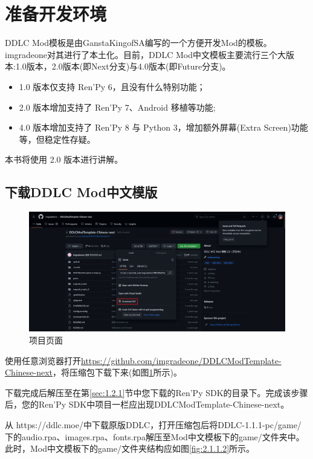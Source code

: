\documentclass[../../Main.tex]{subfiles}
\begin{document}
\section{准备开发环境}
DDLC Mod模板是由GanstaKingofSA编写的一个方便开发Mod的模板。imgradeone对其进行了本土化。目前，DDLC Mod中文模板主要流行三个大版本:1.0版本，2.0版本(即Next分支)与4.0版本(即Future分支)。
\begin{itemize}
    \item 1.0 版本仅支持 Ren'Py 6，且没有什么特别功能；
    \item 2.0 版本增加支持了 Ren'Py 7、Android 移植等功能;
    \item 4.0 版本增加支持了 Ren'Py 8 与 Python 3，增加额外屏幕(Extra Screen)功能等，但稳定性存疑。
\end{itemize}

本书将使用 2.0 版本进行讲解。

\subsection{下载DDLC Mod中文模版}
\label{2.1.1}

\begin{figure}[htb]
    \centering
    \includegraphics[scale=.15]{2.1/2.1.1}
    \caption{项目页面}
    \label{fig:2.1.1.1}
\end{figure}
使用任意浏览器打开\url{https://github.com/imgradeone/DDLCModTemplate-Chinese-next}，将压缩包下载下来(如图\ref{fig:2.1.1.1}所示)。

下载完成后解压至在第\ref{sec:1.2.1}节中您下载的Ren'Py SDK的目录下。完成该步骤后，您的Ren'Py SDK中项目一栏应出现DDLCModTemplate-Chinese-next。

从 https://ddlc.moe/中下载原版DDLC，打开压缩包后将DDLC-1.1.1-pc/game/下的audio.rpa、images.rpa、fonts.rpa解压至Mod中文模板下的game/文件夹中。此时，Mod中文模板下的game/文件夹结构应如图\ref{fig:2.1.1.2}所示。
\end{document}
